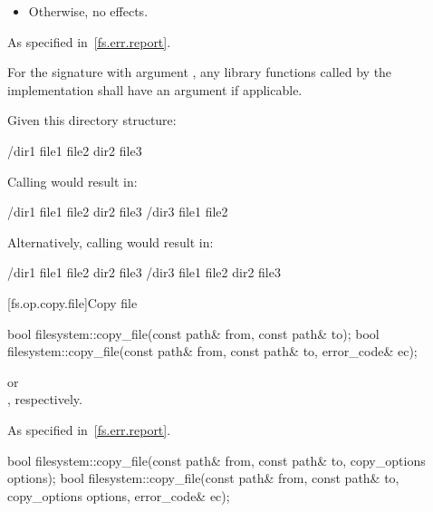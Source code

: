 \begin{itemdescr}
\begin{itemize}
\item
Otherwise, no effects.
\end{itemize}

\pnum
\throws
As specified in~\ref{fs.err.report}.

\pnum
\remarks
For the signature with argument , any
library functions called by the implementation shall have an  argument if applicable.

\pnum
\begin{example}
Given this directory structure:
\begin{outputblock}
/dir1
  file1
  file2
  dir2
    file3
\end{outputblock}

Calling  would result in:
\begin{outputblock}
/dir1
  file1
  file2
  dir2
    file3
/dir3
  file1
  file2
\end{outputblock}

Alternatively, calling  would result in:
\begin{outputblock}
/dir1
  file1
  file2
  dir2
    file3
/dir3
  file1
  file2
  dir2
    file3
\end{outputblock}
\end{example}
\end{itemdescr}


[fs.op.copy.file]{Copy file}

%
\begin{itemdecl}
bool filesystem::copy_file(const path& from, const path& to);
bool filesystem::copy_file(const path& from, const path& to, error_code& ec);
\end{itemdecl}

\begin{itemdescr}
\pnum
\returns
{} or\\
, respectively.

\pnum
\throws
As specified in~\ref{fs.err.report}.
\end{itemdescr}

%
\begin{itemdecl}
bool filesystem::copy_file(const path& from, const path& to, copy_options options);
bool filesystem::copy_file(const path& from, const path& to, copy_options options,
               error_code& ec);
\end{itemdecl}

